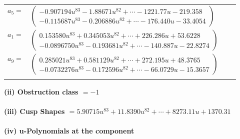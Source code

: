 \documentclass[1p]{elsarticle_modified}
\theoremstyle{definition}
\begin{document}
\begin{tabular}{m{7pt} m{180pt} m{7pt} m{180pt} }
\flushright $a_{5}=$&$\begin{pmatrix}-0.907194 u^{83}-1.88671 u^{82}+\cdots-1221.77 u-219.358\\-0.115687 u^{83}-0.206886 u^{82}+\cdots-176.440 u-33.4054\end{pmatrix}$ \\
\flushright $a_{1}=$&$\begin{pmatrix}0.153580 u^{83}+0.345053 u^{82}+\cdots+226.286 u+53.6228\\-0.0896750 u^{83}-0.193681 u^{82}+\cdots-140.887 u-22.8274\end{pmatrix}$ \\
\flushright $a_{9}=$&$\begin{pmatrix}0.285021 u^{83}+0.581129 u^{82}+\cdots+272.195 u+48.3765\\-0.0732276 u^{83}-0.172596 u^{82}+\cdots-66.0729 u-15.3657\end{pmatrix}$\\&\end{tabular}
\flushleft \textbf{(ii) Obstruction class $= -1$}\\~\\
\flushleft \textbf{(iii) Cusp Shapes $= 5.90715 u^{83}+11.8390 u^{82}+\cdots+8273.11 u+1370.31$}\\~\\
\newpage\renewcommand{\arraystretch}{1}
\flushleft \textbf{(iv) u-Polynomials at the component}\newline \\
\end{document}
